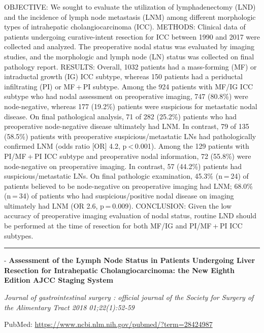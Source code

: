 \documentclass[]{article}
\begin{document}
OBJECTIVE: We sought to evaluate the utilization of lymphadenectomy
(LND) and the incidence of lymph node metastasis (LNM) among different
morphologic types of intrahepatic cholangiocarcinoma (ICC). METHODS:
Clinical data of patients undergoing curative-intent resection for ICC
between 1990 and 2017 were collected and analyzed. The preoperative
nodal status was evaluated by imaging studies, and the morphologic and
lymph node (LN) status was collected on final pathology report. RESULTS:
Overall, 1032 patients had a mass-forming (MF) or intraductal growth
(IG) ICC subtype, whereas 150 patients had a periductal infiltrating
(PI) or MF + PI subtype. Among the 924 patients with MF/IG ICC subtype
who had nodal assessment on preoperative imaging, 747 (80.8\%) were
node-negative, whereas 177 (19.2\%) patients were suspicious for
metastatic nodal disease. On final pathological analysis, 71 of 282
(25.2\%) patients who had preoperative node-negative disease ultimately
had LNM. In contrast, 79 of 135 (58.5\%) patients with preoperative
suspicious/metastatic LNs had pathologically confirmed LNM (odds ratio
{[}OR{]} 4.2, p \textless{} 0.001). Among the 129 patients with
PI/MF + PI ICC subtype and preoperative nodal information, 72 (55.8\%)
were node-negative on preoperative imaging. In contrast, 57 (44.2\%)
patients had suspicious/metastatic LNs. On final pathologic examination,
45.3\% (n = 24) of patients believed to be node-negative on preoperative
imaging had LNM; 68.0\% (n = 34) of patients who had suspicious/positive
nodal disease on imaging ultimately had LNM (OR 2.6, p = 0.009).
CONCLUSION: Given the low accuracy of preoperative imaging evaluation of
nodal status, routine LND should be performed at the time of resection
for both MF/IG and PI/MF + PI ICC subtypes.

{}

{}

\begin{center}\rule{0.5\linewidth}{\linethickness}\end{center}

 - \textbf{Assessment of the Lymph Node Status in Patients Undergoing
Liver Resection for Intrahepatic Cholangiocarcinoma: the New Eighth
Edition AJCC Staging System}

\emph{Journal of gastrointestinal surgery : official journal of the
Society for Surgery of the Alimentary Tract 2018 01;22(1):52-59}

PubMed: \url{https://www.ncbi.nlm.nih.gov/pubmed/?term=28424987}
\end{document}
